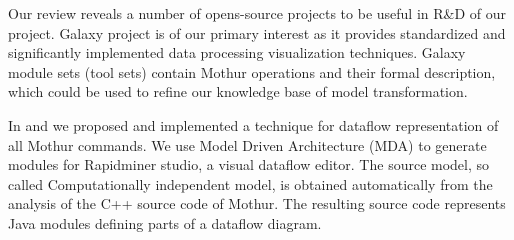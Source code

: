 \documentclass[a4paper]{jpconf}
\begin{document}
Our review reveals a number of opens-source projects to be useful in R\&D of our project.  Galaxy project is of our primary interest as it provides standardized and significantly implemented data processing visualization techniques.  Galaxy module sets (tool sets) contain Mothur operations and their formal description, which could be used to refine our knowledge base of model transformation.

In \cite{cherk19} and \cite{zont19} we proposed and implemented a technique for dataflow representation of all Mothur commands.  We use Model Driven Architecture (MDA) to generate modules for Rapidminer studio, a visual dataflow editor.  %
The source model, so called Computationally independent model, is obtained  automatically from the analysis of the C++ source code of Mothur.  The resulting source code represents Java modules defining parts of a dataflow diagram.


\end{document}
